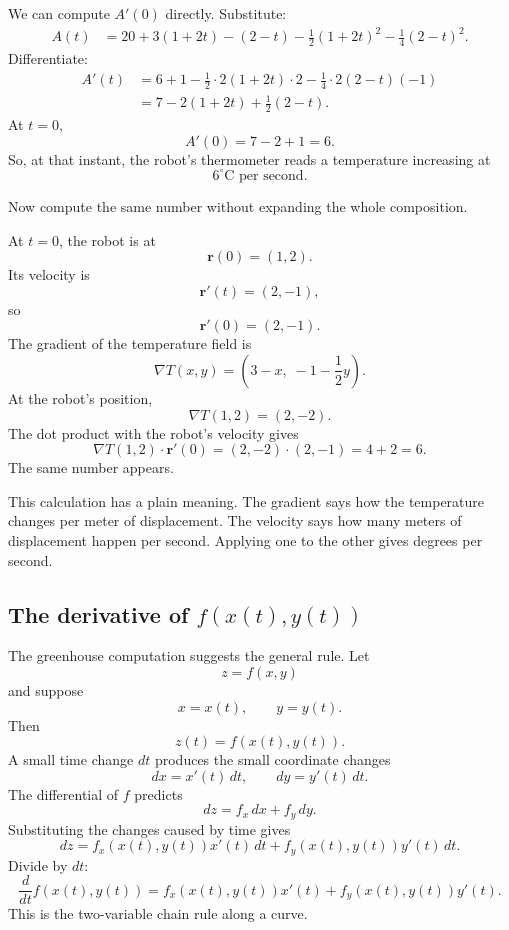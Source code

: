 We can compute \(A'(0)\) directly.  Substitute:
\[
\begin{aligned}
A(t)
&=
20+3(1+2t)-(2-t)
-\frac12(1+2t)^2-\frac14(2-t)^2.
\end{aligned}
\]
Differentiate:
\[
\begin{aligned}
A'(t)
&=
6+1-\frac12\cdot 2(1+2t)\cdot 2
-\frac14\cdot 2(2-t)(-1)\\
&=
7-2(1+2t)+\frac12(2-t).
\end{aligned}
\]
At \(t=0\),
\[
    A'(0)=7-2+1=6.
\]
So, at that instant, the robot's thermometer reads a temperature increasing at
\[
    6^\circ\text{C per second}.
\]

Now compute the same number without expanding the whole composition.

At \(t=0\), the robot is at
\[
    \mathbf r(0)=(1,2).
\]
Its velocity is
\[
    \mathbf r'(t)=(2,-1),
\]
so
\[
    \mathbf r'(0)=(2,-1).
\]
The gradient of the temperature field is
\[
    \nabla T(x,y)=
    \left(3-x,\;-1-\frac12y\right).
\]
At the robot's position,
\[
    \nabla T(1,2)=(2,-2).
\]
The dot product with the robot's velocity gives
\[
    \nabla T(1,2)\cdot \mathbf r'(0)
    =
    (2,-2)\cdot(2,-1)
    =
    4+2
    =
    6.
\]
The same number appears.

This calculation has a plain meaning.  The gradient says how the temperature changes
per meter of displacement.  The velocity says how many meters of displacement happen
per second.  Applying one to the other gives degrees per second.

\subsection{The derivative of \texorpdfstring{\(f(x(t),y(t))\)}{f(x(t),y(t))}}

The greenhouse computation suggests the general rule.  Let
\[
    z=f(x,y)
\]
and suppose
\[
    x=x(t),
    \qquad
    y=y(t).
\]
Then
\[
    z(t)=f(x(t),y(t)).
\]
A small time change \(dt\) produces the small coordinate changes
\[
    dx=x'(t)\,dt,
    \qquad
    dy=y'(t)\,dt.
\]
The differential of \(f\) predicts
\[
    dz=f_x\,dx+f_y\,dy.
\]
Substituting the changes caused by time gives
\[
    dz=
    f_x(x(t),y(t))x'(t)\,dt
    +
    f_y(x(t),y(t))y'(t)\,dt.
\]
Divide by \(dt\):
\[
\boxed{
    \frac{d}{dt}f(x(t),y(t))
    =
    f_x(x(t),y(t))x'(t)
    +
    f_y(x(t),y(t))y'(t).
}
\]
This is the two-variable chain rule along a curve.

